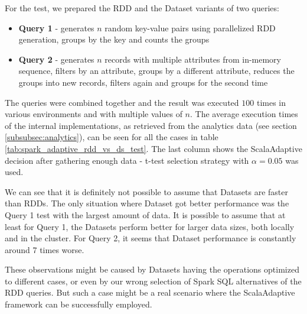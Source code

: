 For the test, we prepared the RDD and the Dataset variants of two queries:
\begin{itemize}
	\item \textbf{Query 1} - generates $n$ random key-value pairs using parallelized RDD generation, groups by the key and counts the groups
	\item \textbf{Query 2} - generates $n$ records with multiple attributes from in-memory sequence, filters by an attribute, groups by a different attribute, reduces the groups into new records, filters again and groups for the second time
\end{itemize}

The queries were combined together and the result was executed $100$ times in various environments and with multiple values of $n$. The average execution times of the internal implementations, as retrieved from the analytics data (see section \ref{subsubsec:analytics}), can be seen for all the cases in table \ref{tab:spark_adaptive_rdd_vs_ds_test}. The last column shows the ScalaAdaptive decision after gathering enough data - t-test selection strategy with $\alpha = 0.05$ was used.

We can see that it is definitely not possible to assume that Datasets are faster than RDDs. The only situation where Dataset got better performance was the Query 1 test with the largest amount of data. It is possible to assume that at least for Query 1, the Datasets perform better for larger data sizes, both locally and in the cluster. For Query 2, it seems that Dataset performance is constantly around 7 times worse.

These observations might be caused by Datasets having the operations optimized to different cases, or even by our wrong selection of Spark SQL alternatives of the RDD queries. But such a case might be a real scenario where the ScalaAdaptive framework can be successfully employed.

